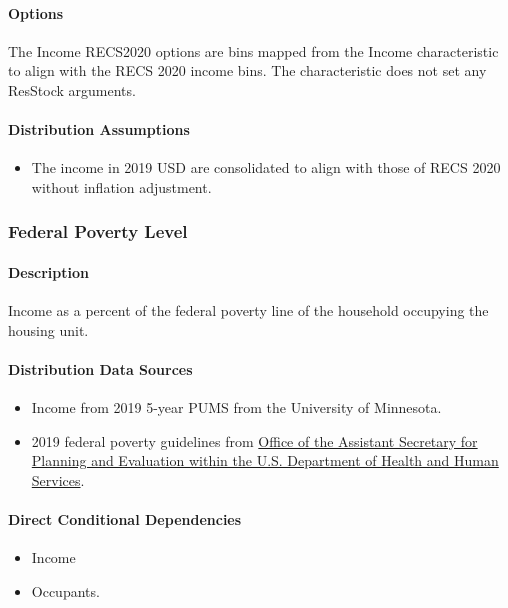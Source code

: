 \paragraph{Options}
The Income RECS2020 options are bins mapped from the Income characteristic to align with the RECS 2020 income bins. The characteristic does not set any ResStock arguments.

\paragraph{Distribution Assumptions}
\begin{itemize}
\item
  The income in 2019 USD are consolidated to align with those of RECS 2020 without inflation adjustment.
\end{itemize}

\subsubsection{Federal Poverty Level}\label{federal_poverty_level}
\paragraph{Description}
Income as a percent of the federal poverty line of the household occupying the housing unit.

\paragraph{Distribution Data Sources}
\begin{itemize}
\item
  Income from 2019 5-year PUMS from the University of Minnesota.
\item
  2019 federal poverty guidelines from \href{https://aspe.hhs.gov/topics/poverty-economic-mobility/poverty-guidelines/prior-hhs-poverty-guidelines-federal-register-references/2019-poverty-guidelines}{Office of the Assistant Secretary for Planning and Evaluation within the U.S. Department of Health and Human Services}.
\end{itemize}

\paragraph{Direct Conditional Dependencies}
\begin{itemize}
    \item Income
    \item Occupants.
\end{itemize}

